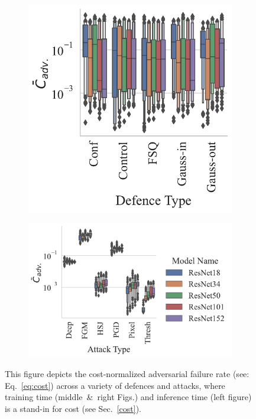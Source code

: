 \begin{figure}
\begin{subfigure}{0.28\textwidth}
        \includegraphics[width=\textwidth]{cifar/adv_failures_per_train_time_vs_defence_type.pdf}
        \centering
    \end{subfigure}
    \begin{subfigure}{0.42\textwidth}
        \includegraphics[width=\textwidth]{cifar/adv_failures_per_train_time_vs_attack_type.pdf}
        \centering
    \end{subfigure}
    \caption{This figure depicts the cost-normalized adversarial failure rate (see: Eq.~\ref{eq:cost}) across a variety of defences and attacks, where training time (middle~\&~right Figs.) and inference time (left figure) is a stand-in for cost (see Sec.~\ref{cost}).}
    \label{fig:failures_per_train_time}
\end{figure}

